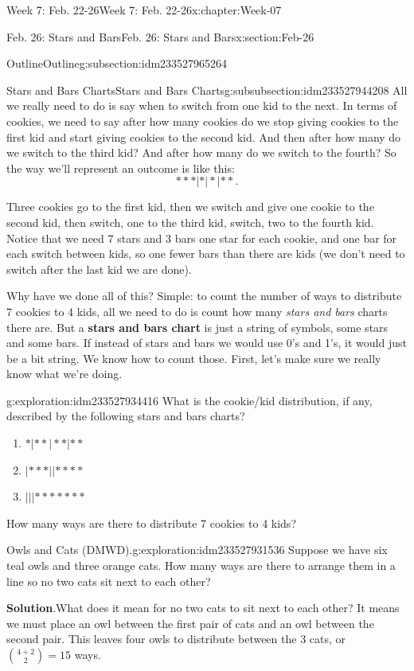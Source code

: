 \documentclass[oneside,10pt,]{book}
\newcommand{\blocktitlefont}{\relax}
\newcommand{\terminology}[1]{\textbf{#1}}
\numberwithin{equation}{section}
\begin{document}
\begin{chapterptx}{Week 7: Feb. 22-26}{}{Week 7: Feb. 22-26}{}{}{x:chapter:Week-07}
\begin{sectionptx}{Feb. 26: Stars and Bars}{}{Feb. 26: Stars and Bars}{}{}{x:section:Feb-26}
\begin{subsectionptx}{Outline}{}{Outline}{}{}{g:subsection:idm233527965264}
\begin{subsubsectionptx}{Stars and Bars Charts}{}{Stars and Bars Charts}{}{}{g:subsubsection:idm233527944208}
All we really need to do is say when to switch from one kid to the next. In terms of cookies, we need to say after how many cookies do we stop giving cookies to the first kid and start giving cookies to the second kid. And then after how many do we switch to the third kid? And after how many do we switch to the fourth? So the way we'll represent an outcome is like this:%
\begin{equation*}
***|*|*|**\text{.}
\end{equation*}
%
\par
Three cookies go to the first kid, then we switch and give one cookie to the second kid, then switch, one to the third kid, switch, two to the fourth kid. Notice that we need 7 stars and 3 bars \textendash{} one star for each cookie, and one bar for each switch between kids, so one fewer bars than there are kids (we don't need to switch after the last kid \textendash{} we are done).%
\par
Why have we done all of this? Simple: to count the number of ways to distribute 7 cookies to 4 kids, all we need to do is count how many \emph{stars and bars} charts there are. But a \terminology{stars and bars chart}  is just a string of symbols, some stars and some bars. If instead of stars and bars we would use 0's and 1's, it would just be a bit string.  We know how to count those. First, let's make sure we really know what we're doing.%
\begin{exploration}{}{g:exploration:idm233527934416}%
What is the cookie\slash{}kid distribution, if any, described by the following stars and bars charts?%
%
\begin{enumerate}
\item{}\(\displaystyle *|**|**|**\)%
\item{}\(\displaystyle |***||****\)%
\item{}\(\displaystyle |||*******\)%
\end{enumerate}
How many ways are there to distribute 7 cookies to 4 kids?%
\end{exploration}%
\begin{exploration}{Owls and Cats (DMWD).}{g:exploration:idm233527931536}%
Suppose we have six teal owls and three orange cats. How many ways are there to arrange them in a line so no two cats sit next to each other?%
\par\smallskip%
\noindent\textbf{\blocktitlefont Solution}.\hypertarget{g:solution:idm233527930576}{}\quad{}What does it mean for no two cats to sit next to each other? It means we must place an owl between the first pair of cats and an owl between the second pair. This leaves four owls to distribute between the 3 cats, or \(\binom{4+2}{2} = 15\) ways.\end{exploration}%

\end{subsubsectionptx}
\end{subsectionptx}
\end{sectionptx}
\end{chapterptx}
\end{document}
